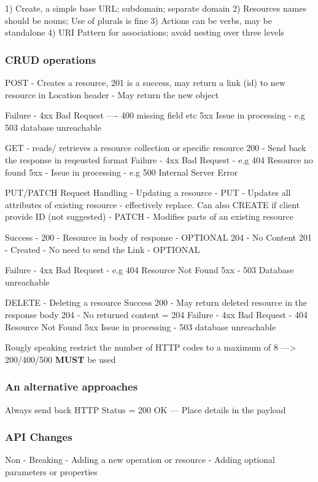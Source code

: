 1) Create, a simple base URL; subdomain; separate domain
2) Resources names should be nouns; Use of plurals is fine
3) Actions can be verbs, may be standalone
4) URI Pattern for associations; avoid nesting over three levels

\subsubsection{CRUD operations}
POST - Creates a resource,
201 is a success, may return a link (id) to new resource in Location header
- May return the new object

Failure - 4xx Bad Request ---- 400 missing field etc
5xx Issue in processing - e.g 503 database unreachable

GET - reads/ retrieves a resource collection or specific resource
200 - Send back the response in reqeusted format
Failure - 4xx Bad Request - e.g 404 Resource no found
5xx - Issue in processing - e.g 500 Internal Server Error

PUT/PATCH Request Handling - Updating a resource
- PUT - Updates all attributes of existing resource - effectively replace. Can also CREATE if client provide ID (not suggested)
- PATCH - Modifies parts of an existing resource

Success - 200 - Resource in body of response - OPTIONAL
204 - No Content
201 - Created - No need to send the Link - OPTIONAL

Failure - 4xx Bad Request - e.g 404 Resource Not Found
5xx - 503 Database unreachable

DELETE - Deleting a resource
Success 200 - May return deleted resource in the response body
204 - No returned content = 204
Failure - 4xx Bad Request - 404 Resource Not Found
5xx Issue in processing - 503 database unreachable

Rougly speaking restrict the number of HTTP codes to a maximum of 8
---> 200/400/500 \textbf{MUST} be used

\subsubsection{An alternative approaches}
Always send back HTTP Status = 200 OK
--- Place details in the payload

\subsubsection{API Changes}
Non - Breaking
- Adding a new operation or resource
- Adding optional parameters or properties

